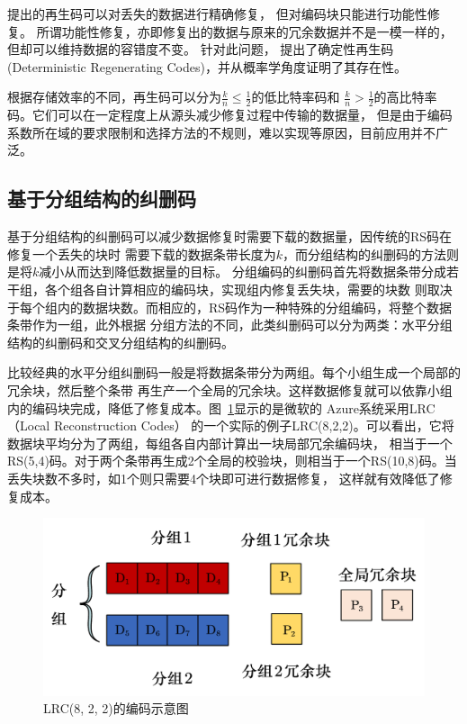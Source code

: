 \citet{dimakis2010network}提出的再生码可以对丢失的数据进行精确修复，
但对编码块只能进行功能性修复。
所谓功能性修复，亦即修复出的数据与原来的冗余数据并不是一模一样的，但却可以维持数据的容错度不变。
针对此问题，
\citet{wu2007deterministic}提出了确定性再生码
(Deterministic Regenerating Codes)，并从概率学角度证明了其存在性。

根据存储效率的不同，再生码可以分为$\frac{k}{n}\leqslant \frac{1}{2}$的低比特率码和
$\frac{k}{n}> \frac{1}{2}$的高比特率码。它们可以在一定程度上从源头减少修复过程中传输的数据量，
但是由于编码系数所在域的要求限制和选择方法的不规则，难以实现等原因，目前应用并不广泛。


\subsection{基于分组结构的纠删码}
基于分组结构的纠删码可以减少数据修复时需要下载的数据量，因传统的RS码在修复一个丢失的块时
需要下载的数据条带长度为$k$，而分组结构的纠删码的方法则是将$k$减小从而达到降低数据量的目标。
分组编码的纠删码首先将数据条带分成若干组，各个组各自计算相应的编码块，实现组内修复丢失块，需要的块数
则取决于每个组内的数据块数。而相应的，RS码作为一种特殊的分组编码，将整个数据条带作为一组，此外根据
分组方法的不同，此类纠删码可以分为两类：水平分组结构的纠删码和交叉分组结构的纠删码。

比较经典的水平分组纠删码一般是将数据条带分为两组。每个小组生成一个局部的冗余块，然后整个条带
再生产一个全局的冗余块。这样数据修复就可以依靠小组内的编码块完成，降低了修复成本。图~\ref{fig:con-1.7}显示的是微软的
Azure系统\cite{calder2011windows}采用LRC（Local Reconstruction Codes）\cite{huang2012erasure}
的一个实际的例子LRC(8,2,2)。可以看出，它将数据块平均分为了两组，每组各自内部计算出一块局部冗余编码块，
相当于一个RS(5,4)码。对于两个条带再生成2个全局的校验块，则相当于一个RS(10,8)码。当丢失块数不多时，如1个则只需要4个块即可进行数据修复，
这样就有效降低了修复成本。

\begin{figure}[tb]
	\centering
	\includegraphics [scale=0.5]{figures/1.7.pdf}
	\caption{LRC(8, 2, 2)的编码示意图}
	\label{fig:con-1.7}
\end{figure}


